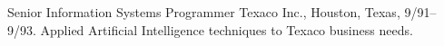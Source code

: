 \section{}
    {Senior Information Systems Programmer} {Texaco Inc., Houston,
    Texas, 9/91--9/93.  Applied  Artificial
    Intelligence techniques to Texaco business needs.}

    
